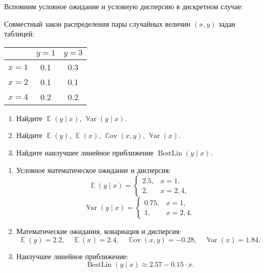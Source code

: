\documentclass[12pt]{article}
\DeclareMathOperator{\Cov}{\mathbb{C}ov}
\DeclareMathOperator{\Var}{\mathbb{V}ar}
\DeclareMathOperator{\BestLin}{BestLin}
\DeclareMathOperator{\E}{\mathbb{E}}
\begin{document}
Вспомним условное ожидание и условную дисперсию в дискретном случае:
\begin{problem}
Совместный закон распределения пары случайных величин $(x, y)$ задан таблицей:

\begin{tabular}{ccc}
\toprule
     & $y = 1$ & $y = 3$ \\
\midrule
$x = 1$ & 0.1 & 0.3 \\
$x = 2$ & 0.1 & 0.1 \\
$x = 4$ & 0.2 & 0.2 \\
\bottomrule
\end{tabular}

\begin{enumerate}
    \item Найдите $\E(y \mid x)$, $\Var(y \mid x)$.
    \item Найдите $\E(y)$, $\E(x)$, $\Cov(x, y)$, $\Var(x)$.
    \item Найдите наилучшее линейное приближение $\BestLin(y \mid x)$.
\end{enumerate}

    \begin{sol}
    \begin{enumerate}
    \item Условное математическое ожидание и дисперсия:
   \[
   \E(y \mid x) = \begin{cases}
   2.5, & x = 1, \\
   2, & x = 2, 4,
   \end{cases}
   \]
   \[
   \Var(y \mid x) = \begin{cases}
   0.75, & x = 1, \\
   1, & x = 2, 4.
   \end{cases}
   \]
    \item Математические ожидания, ковариация и дисперсия:
   \[
   \E(y) = 2.2, \quad \E(x) = 2.4, \quad \Cov(x, y) = -0.28, \quad \Var(x) = 1.84.
   \]
    \item Наилучшее линейное приближение:
   \[
   \BestLin(y \mid x) \approx 2.57 - 0.15 \cdot x.
   \]
   \end{enumerate}
    \end{sol}
\end{problem}
\end{document}
